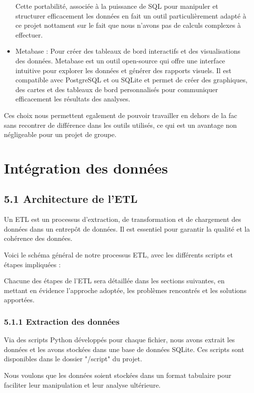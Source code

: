 \begin{itemize}
Cette portabilité, associée à la puissance de SQL pour manipuler et structurer efficacement les données en fait un outil particulièrement adapté à ce projet nottament sur le fait que nous n'avons pas de calculs complexes à effectuer.
\item Metabase : Pour créer des tableaux de bord interactifs et des visualisations des données. Metabase est un outil open-source qui offre une interface intuitive pour explorer les données et générer des rapports visuels.
Il est compatible avec PostgreSQL et ou SQLite et permet de créer des graphiques, des cartes et des tableaux de bord personnalisés pour communiquer efficacement les résultats des analyses.
\end{itemize}

Ces choix nous permettent egalement de pouvoir travailler en dehors de la fac sans recontrer de différence dans les outils utilisés, ce qui est un avantage non négligeable pour un projet de groupe.

\chapter*{Intégration des données}


\section*{5.1 Architecture de l’ETL}

Un ETL est un processus d’extraction, de transformation et de chargement des données dans un entrepôt de données. Il est essentiel pour garantir la qualité et la cohérence des données.

Voici le schéma général de notre processus ETL, avec les différents scripts et étapes impliquées :


Chacune des étapes de l’ETL sera détaillée dans les sections suivantes, en mettant en évidence l'approche adoptée, les problèmes rencontrés et les solutions apportées.

\subsection{5.1.1 Extraction des données}

Via des scripts Python développés pour chaque fichier, nous avons extrait les données et les avons stockées dans une base de données SQLite.
Ces scripts sont disponibles dans le dossier "/script" du projet.

Nous voulons que les données soient stockées dans un format tabulaire pour faciliter leur manipulation et leur analyse ultérieure.

